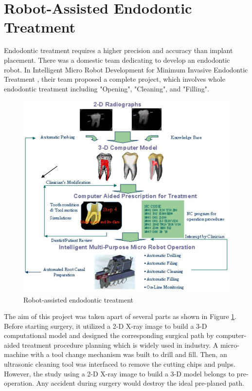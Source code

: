 \section{Robot-Assisted Endodontic Treatment}
\hspace*{6mm}Endodontic treatment requires a higher precision and accuracy than implant placement. There was a domestic team dedicating to develop an endodontic robot. In Intelligent Micro Robot Development for Minimum Invasive Endodontic Treatment \cite{dong2006wip,everett2014feasibility,dong2010design,Neha2017MicroR}, their team proposed a complete project, which involves whole endodontic treatment including "Opening", "Cleaning", and "Filling". 
\par
\begin{figure}[htbp]
	\begin{center}
	\includegraphics[width=0.95\linewidth]{Images/NCTU_2.png}
	\caption[Robot-assisted endodontic treatment]{Robot-assisted endodontic treatment \cite{everett2014feasibility}}	
	\label{fig:NCTU_2}
	\end{center}
\end{figure}
\par
The aim of this project was taken apart of several parts as shown in Figure \ref{fig:NCTU_2}. Before starting surgery, it utilized a 2-D X-ray image to build a 3-D computational model and designed the corresponding surgical path by computer-aided treatment procedure planning which is widely used in industry. A micro-machine with a tool change mechanism was built to drill and fill. Then, an ultrasonic cleaning tool was interfaced to remove the cutting chips and pulps. However, the study using a 2-D X-ray image to build a 3-D model belongs to pre-operation. Any accident during surgery would destroy the ideal pre-planed path.
